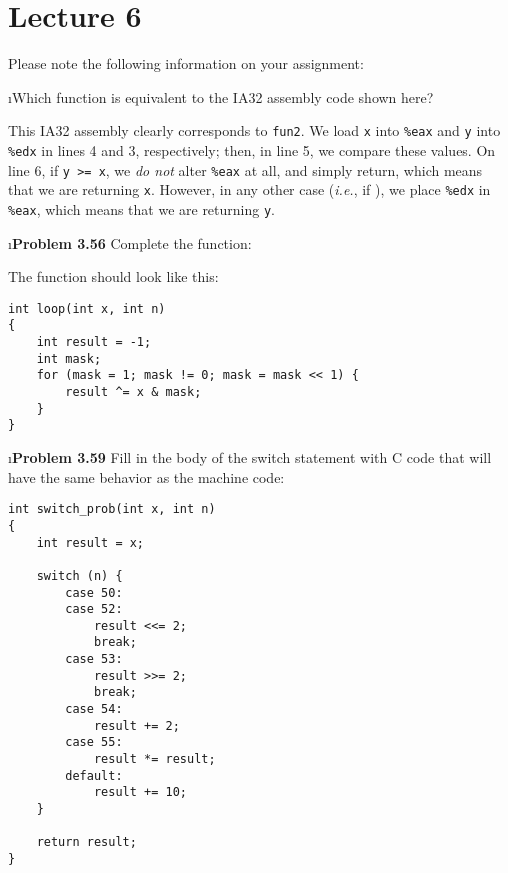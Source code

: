 \documentclass[fleqn]{article}
\begin{document}

\section{Lecture 6}

Please note the following information on your assignment:

\bee
\i Which function is equivalent to the IA32 assembly code shown here?


\begin{solution}
This IA32 assembly clearly corresponds to \texttt{fun2}. We load \texttt{x} into \texttt{\%eax} and \texttt{y} into \texttt{\%edx} in lines 4 and 3, respectively; then, in line 5, we compare these values. On line 6, if \texttt{y >= x}, we \textit{do not} alter \texttt{\%eax} at all, and simply return, which means that we are returning \texttt{x}. However, in any other case (\textit{i.e.}, if ), we place \texttt{\%edx} in \texttt{\%eax}, which means that we are returning \texttt{y}.
\end{solution}


\i \textbf{Problem 3.56} Complete the function:

\begin{solution}
The function should look like this:

\begin{verbatim}
int loop(int x, int n)
{
    int result = -1;
    int mask;
    for (mask = 1; mask != 0; mask = mask << 1) {
        result ^= x & mask;
    }
}
\end{verbatim}
\end{solution}

\i \textbf{Problem 3.59} Fill in the body of the switch statement with C code that will have the same behavior as the machine code:


\begin{solution}
\begin{verbatim}
int switch_prob(int x, int n)
{
    int result = x;
    
    switch (n) {
        case 50:
        case 52:
            result <<= 2;
            break;
        case 53:
            result >>= 2;
            break;
        case 54:
            result += 2;
        case 55:
            result *= result;
        default:
            result += 10;
    }
    
    return result;
}
\end{verbatim}
\end{solution}
\end{document}
